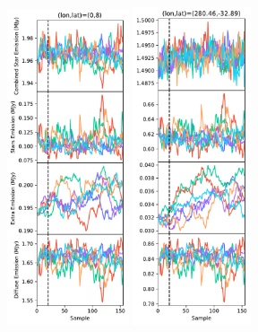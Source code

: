 \documentclass{aa}
\begin{document}
\begin{figure}
  \centering
  \includegraphics[width=0.32\textwidth]{figs/mixing/trace_1352704.pdf} 
  \includegraphics[width=0.31\textwidth]{figs/mixing/trace_2429499.pdf}

\end{figure}
\end{document}
